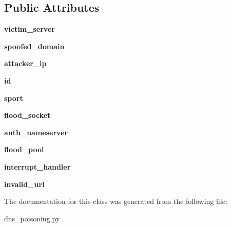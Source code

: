\subsection*{Public Attributes}
\begin{DoxyCompactItemize}
\item 
\mbox{\label{classdns__poisoning_1_1DNSPoisoning_a7ddda8f8750a3f6be247ba0aa2ae62da}} 
{\bfseries victim\+\_\+server}
\item 
\mbox{\label{classdns__poisoning_1_1DNSPoisoning_a837298577cd23e34cf06ca469ab2ae77}} 
{\bfseries spoofed\+\_\+domain}
\item 
\mbox{\label{classdns__poisoning_1_1DNSPoisoning_a1930111c8e62f71561f7fc808f17f306}} 
{\bfseries attacker\+\_\+ip}
\item 
\mbox{\label{classdns__poisoning_1_1DNSPoisoning_a96cc4f6a6168118999763b206b72cf96}} 
{\bfseries id}
\item 
\mbox{\label{classdns__poisoning_1_1DNSPoisoning_a5cee7b7d0614a3baade77dcf4d5db1d7}} 
{\bfseries sport}
\item 
\mbox{\label{classdns__poisoning_1_1DNSPoisoning_ab54c7e8e4345d5ac1b054a2bf91aead5}} 
{\bfseries flood\+\_\+socket}
\item 
\mbox{\label{classdns__poisoning_1_1DNSPoisoning_a2b7e61ab81185add0d7a97baab36924f}} 
{\bfseries auth\+\_\+nameserver}
\item 
\mbox{\label{classdns__poisoning_1_1DNSPoisoning_a00a22b2725214b6052827a16b067066e}} 
{\bfseries flood\+\_\+pool}
\item 
\mbox{\label{classdns__poisoning_1_1DNSPoisoning_a9c8aa320d6ae14df500e4e04cf5f0881}} 
{\bfseries interrupt\+\_\+handler}
\item 
\mbox{\label{classdns__poisoning_1_1DNSPoisoning_a57e074a324e5682d4a0a0a02856c8e39}} 
{\bfseries invalid\+\_\+url}
\end{DoxyCompactItemize}


The documentation for this class was generated from the following file\+:\begin{DoxyCompactItemize}
\item 
dns\+\_\+poisoning.\+py\end{DoxyCompactItemize}
